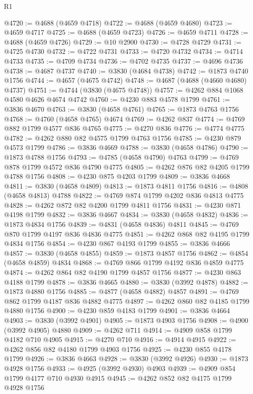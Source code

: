\begin{lexlean}{R1}
\begin{coremodule}
@4720 := @4688 (@4659 @4718)
@4722 := @4688 (@4659 @4680)
@4723 := @4659 @4717
@4725 := @4688 (@4659 @4723)
@4726 := @4659 @4711
@4728 := @4688 (@4659 @4726)
@4729 := @10 @2900
@4730 := @4728 @4729
@4731 := @4725 @4730
@4732 := @4722 @4731
@4733 := @4720 @4732
@4734 := @4714 @4733
@4735 := @4709 @4734
@4736 := @4702 @4735
@4737 := @4696 @4736
@4738 := @4687 @4737
@4740 := @3830 (@4684 @4738)
@4742 := @1873 @4740 @1756
@4744 := @4657 (@4675 @4742)
@4748 := @4687 (@4688 (@4660 @4680) @4737)
@4751 := @4744 (@3830 (@4675 @4748))
@4757 := @4262 @884 @1068 @4580 @4626 @4674 @4742
@4760 := @4230 @883 @4578 @1799
@4761 := @3836 @4670
@4763 := @3830 (@4658 @4761)
@4765 := @1873 @4763 @1756
@4768 := @4760 (@4658 @4765) @4674
@4769 := @4262 @837
@4774 := @4769 @882 @1799 @4577 @836 @4765
@4775 := @4270 @836
@4776 := @4774 @4775
@4782 := @4262 @880 @82 @4575 @1799 @4763 @1756
@4785 := @4230 @879 @4573 @1799
@4786 := @3836 @4669
@4788 := @3830 (@4658 @4786)
@4790 := @1873 @4788 @1756
@4793 := @4785 (@4658 @4790) @4763
@4799 := @4769 @878 @1799 @4572 @836 @4790 @4775
@4805 := @4262 @876 @82 @4205 @1799 @4788 @1756
@4808 := @4230 @875 @4203 @1799
@4809 := @3836 @4668
@4811 := @3830 (@4658 @4809)
@4813 := @1873 @4811 @1756
@4816 := @4808 (@4658 @4813) @4788
@4822 := @4769 @874 @1799 @4202 @836 @4813 @4775
@4828 := @4262 @872 @82 @4200 @1799 @4811 @1756
@4831 := @4230 @871 @4198 @1799
@4832 := @3836 @4667
@4834 := @3830 (@4658 @4832)
@4836 := @1873 @4834 @1756
@4839 := @4831 (@4658 @4836) @4811
@4845 := @4769 @870 @1799 @4197 @836 @4836 @4775
@4851 := @4262 @868 @82 @4195 @1799 @4834 @1756
@4854 := @4230 @867 @4193 @1799
@4855 := @3836 @4666
@4857 := @3830 (@4658 @4855)
@4859 := @1873 @4857 @1756
@4862 := @4854 (@4658 @4859) @4834
@4868 := @4769 @866 @1799 @4192 @836 @4859 @4775
@4874 := @4262 @864 @82 @4190 @1799 @4857 @1756
@4877 := @4230 @863 @4188 @1799
@4878 := @3836 @4665
@4880 := @3830 (@3992 @4878)
@4882 := @1873 @4880 @1756
@4885 := @4877 (@4658 @4882) @4857
@4891 := @4769 @862 @1799 @4187 @836 @4882 @4775
@4897 := @4262 @860 @82 @4185 @1799 @4880 @1756
@4900 := @4230 @859 @4183 @1799
@4901 := @3836 @4664
@4903 := @3830 (@3992 @4901)
@4905 := @1873 @4903 @1756
@4908 := @4900 (@3992 @4905) @4880
@4909 := @4262 @711
@4914 := @4909 @858 @1799 @4182 @710 @4905
@4915 := @4270 @710
@4916 := @4914 @4915
@4922 := @4262 @856 @82 @4180 @1799 @4903 @1756
@4925 := @4230 @855 @4178 @1799
@4926 := @3836 @4663
@4928 := @3830 (@3992 @4926)
@4930 := @1873 @4928 @1756
@4933 := @4925 (@3992 @4930) @4903
@4939 := @4909 @854 @1799 @4177 @710 @4930 @4915
@4945 := @4262 @852 @82 @4175 @1799 @4928 @1756

\end{coremodule}
\end{lexlean}
